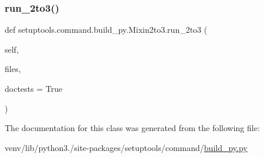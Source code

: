 \subsubsection{\texorpdfstring{run\+\_\+2to3()}{run\_2to3()}}
{\footnotesize\ttfamily def setuptools.\+command.\+build\+\_\+py.\+Mixin2to3.\+run\+\_\+2to3 (\begin{DoxyParamCaption}\item[{}]{self,  }\item[{}]{files,  }\item[{}]{doctests = {\ttfamily True} }\end{DoxyParamCaption})}



The documentation for this class was generated from the following file\+:\begin{DoxyCompactItemize}
\item 
venv/lib/python3./site-\/packages/setuptools/command/\hyperlink{setuptools_2command_2build__py_8py}{build\+\_\+py.\+py}\end{DoxyCompactItemize}
